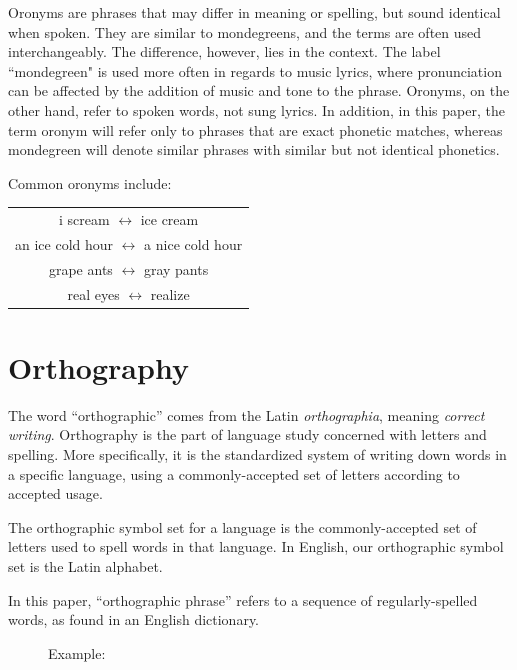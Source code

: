 Oronyms are phrases that may differ in meaning or spelling, but sound identical when spoken.  They are similar to mondegreens, and the terms are often used interchangeably.  The difference, however, lies in the context.  The label ``mondegreen" is used more often in regards to music lyrics, where pronunciation can be affected by the addition of music and tone to the phrase. Oronyms, on the other hand, refer to spoken words, not sung lyrics.\cite{dictionaryOronymDef} In addition, in this paper, the term oronym will refer only to phrases that are exact phonetic matches, whereas mondegreen will denote similar phrases with similar but not identical phonetics.

Common oronyms include:
\begin{center}
\begin{tabular}{ c }
i scream $\leftrightarrow$ ice cream \\
an ice cold hour $\leftrightarrow$  a nice cold hour \\
grape ants $\leftrightarrow$  gray pants \\
real eyes $\leftrightarrow$  realize \\
\end{tabular}
\end{center}

\section{Orthography}
\label{vocab:orthography}
The word ``orthographic'' comes from the Latin \emph{orthographia}, meaning \emph{correct writing}.   Orthography is the part of language study concerned with letters and spelling.  More specifically, it is the standardized system of writing down words in a specific language, using a commonly-accepted set of letters according to accepted usage. \cite{dictionaryDotComOrthography} 

The orthographic symbol set for a language is the commonly-accepted set of letters used to spell words in that language.  In English, our orthographic symbol set is the Latin alphabet.

In this paper, ``orthographic phrase'' refers to a sequence of regularly-spelled words, as found in an English dictionary.

\begin{figure}[h]
\begin{center}
Example:  
\end{center}
\end{figure}


